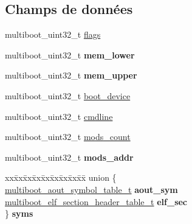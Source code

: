 \subsection*{Champs de données}
\begin{DoxyCompactItemize}
\item 
multiboot\+\_\+uint32\+\_\+t \hyperlink{structmultiboot__info_aa562865bc325fd785c9fa4c5056294f3}{flags}
\item 
\hypertarget{structmultiboot__info_aa3503176ee0d132ef98537fa0b36ff09}{multiboot\+\_\+uint32\+\_\+t {\bfseries mem\+\_\+lower}}\label{structmultiboot__info_aa3503176ee0d132ef98537fa0b36ff09}

\item 
\hypertarget{structmultiboot__info_a87db5803d5a79490b2bf32cb8e9a05c9}{multiboot\+\_\+uint32\+\_\+t {\bfseries mem\+\_\+upper}}\label{structmultiboot__info_a87db5803d5a79490b2bf32cb8e9a05c9}

\item 
multiboot\+\_\+uint32\+\_\+t \hyperlink{structmultiboot__info_ac7dd626a05c9ba62d55ea8a7a254de80}{boot\+\_\+device}
\item 
multiboot\+\_\+uint32\+\_\+t \hyperlink{structmultiboot__info_a0f2f05f69c69c615bf2b4820d357cf36}{cmdline}
\item 
multiboot\+\_\+uint32\+\_\+t \hyperlink{structmultiboot__info_aebdafce31f94277d138202f7b1ec35cc}{mods\+\_\+count}
\item 
\hypertarget{structmultiboot__info_a854bdbfa7b23c9c3dfa0bfc155ef8242}{multiboot\+\_\+uint32\+\_\+t {\bfseries mods\+\_\+addr}}\label{structmultiboot__info_a854bdbfa7b23c9c3dfa0bfc155ef8242}

\item 
\hypertarget{structmultiboot__info_a5958615dc99c7ba6e408338169f12108}{\begin{tabbing}
xx\=xx\=xx\=xx\=xx\=xx\=xx\=xx\=xx\=\kill
union \{\\
\hypertarget{unionmultiboot__info_1_1@1_acf01e96c5d199a398901516df535a5bb}{\>\hyperlink{structmultiboot__aout__symbol__table}{multiboot\_aout\_symbol\_table\_t} {\bfseries aout\_sym}\\
\hypertarget{unionmultiboot__info_1_1@1_ab06f895b6b56ca37c8123d145da52387}{\>\hyperlink{structmultiboot__elf__section__header__table}{multiboot\_elf\_section\_header\_table\_t} {\bfseries elf\_sec}\\
\} {\bfseries syms}}\label{structmultiboot__info_a5958615dc99c7ba6e408338169f12108}
\\

}
\end{tabbing}}
\end{DoxyCompactItemize}

